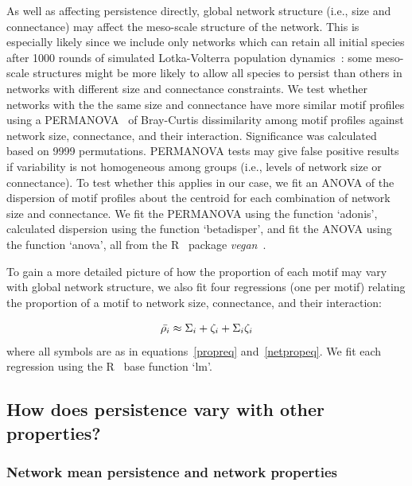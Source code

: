 \documentclass[12pt]{article}
\begin{document}
\begin{spacing}{2.0}
        As well as affecting persistence directly, global network structure (i.e., size and connectance) may affect the meso-scale structure of the network.
        This is especially likely since we include only networks which can retain all initial species after 1000 rounds of simulated Lotka-Volterra population dynamics~\citep{Cirtwill2021_inprep}:  some meso-scale structures might be more likely to allow all species to persist than others in networks with different size and connectance constraints.
        We test whether networks with the the same size and connectance have more similar motif profiles using a PERMANOVA~\citep{Anderson2001} of Bray-Curtis dissimilarity among motif profiles against network size, connectance, and their interaction.
        Significance was calculated based on 9999 permutations.
        PERMANOVA tests may give false positive results if variability is not homogeneous among groups (i.e., levels of network size or connectance).
        To test whether this applies in our case, we fit an ANOVA of the dispersion of motif profiles about the centroid for each combination of network size and connectance. 
        We fit the PERMANOVA using the function `adonis', calculated dispersion using the function `betadisper', and fit the ANOVA using the function `anova', all from the R~\citep{R} package \emph{vegan}~\citep{vegan}.


        To gain a more detailed picture of how the proportion of each motif may vary with global network structure, we also fit four regressions (one per motif) relating the proportion of a motif to network size, connectance, and their interaction:

        \begin{equation}
            \Bar{\rho_{i}} \approx \Sigma_{i} + \zeta_{i} + \Sigma_{i}\zeta_{i}
        \end{equation}
        where all symbols are as in equations~\ref{propreq} and~\ref{netpropeq}.
        We fit each regression using the R~\citep{R} base function `lm'.
            

    \subsection{How does persistence vary with other properties?}

        \subsubsection{Network mean persistence and network properties}
    

\end{spacing}
\end{document}

